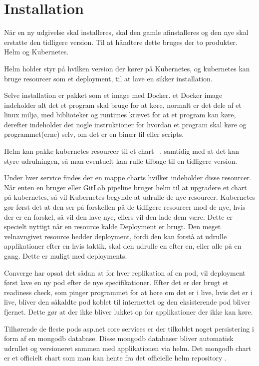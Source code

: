 \section{Installation}

Når en ny udgivelse skal installeres, skal den gamle afinstalleres og den nye skal erstatte den tidligere version. Til at håndtere dette bruges der to produkter. Helm og Kubernetes.

Helm holder styr på hvilken version der kører på Kubernetes, og kubernetes kan bruge resourcer som et deployment, til at lave en sikker installation.

Selve installation er pakket som et image med Docker. et Docker image indeholder alt det et program skal bruge for at køre, normalt er det dele af et linux miljø, med biblioteker og runtimes krævet for at et program kan køre, derefter indeholder det nogle instruktioner for hvordan et program skal køre og programmet(erne) selv, om det er en binær fil eller scripts.

Helm kan pakke kubernetes resourcer til et chart ~\cite[Chart]{helm_chart}, samtidig med at det kan styre udrulningen, så man eventuelt kan rulle tilbage til en tidligere version.

Under hver service findes der en mappe charts hvilket indeholder disse resourcer. Når enten en bruger eller GitLab pipeline bruger helm til at upgradere et chart på kubernetes, så vil Kubernetes begynde at udrulle de nye resourcer. Kubernetes gør først det at den ser på forskellen på de tidligere resourcer mod de nye, hvis der er en forskel, så vil den lave nye, ellers vil den lade dem være. Dette er specielt nyttigt når en resource kalde Deployment er brugt. Den meget velnavngivet resource hedder deployment, fordi den kan forstå at udrulle applikationer efter en hvis taktik, skal den udrulle en efter en, eller alle på en gang. Dette er muligt med deployments.

Converge har opsat det sådan at for hver replikation af en pod, vil deployment først lave en ny pod efter de nye specifikationer. Efter det er der brugt et readiness check, som pinger programmet for at høre om det er i live, hvis det er i live, bliver den såkaldte pod koblet til internettet og den eksisterende pod bliver fjernet. Dette gør at der ikke bliver lukket op for applikationer der ikke kan køre.

Tilhørende de fleste pods asp.net core services er der tilkoblet noget persistering i form af en mongodb database. Disse mongodb databaser bliver automatisk udrullet og versioneret sammen med applikationen via helm. Det mongodb chart er et officielt chart som man kan hente fra det officielle helm repository .

